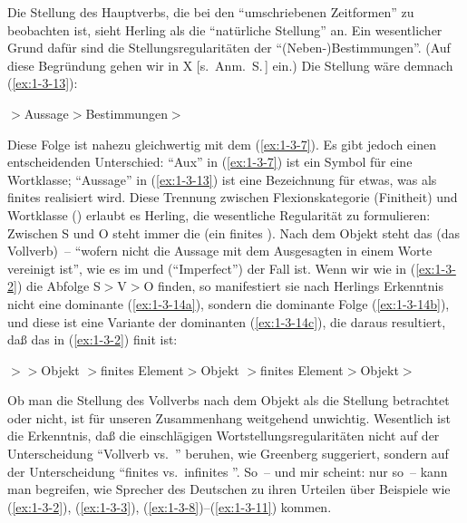 \documentclass[output=paper]{langsci/langscibook}
\begin{document}
Die Stellung des Hauptverbs, die bei den "`umschriebenen Zeitformen"' zu beobachten ist, sieht Herling als die "`natürliche Stellung"' an. Ein wesentlicher Grund dafür sind die Stellungsregularitäten der "`(Neben-)Bestimmungen"'. (Auf diese Begründung gehen wir in X [s.\ Anm.\ S.\,\pageref{fn-herausgeber-topo}]\label{X:8} ein.) Die  Stellung wäre demnach (\ref{ex:1-3-13}):
\begin{exe}
\ex\label{ex:1-3-13}
$>$Aussage$>$Bestimmungen$>$
\end{exe}
Diese Folge ist nahezu gleichwertig mit dem  (\ref{ex:1-3-7}). Es gibt jedoch einen entscheidenden Unterschied: "`Aux"' in (\ref{ex:1-3-7}) ist ein Symbol für eine Wortklasse; "`Aussage"' in (\ref{ex:1-3-13}) ist eine Bezeichnung für etwas, was als finites  realisiert wird. Diese
Trennung zwischen Flexionskategorie (Finitheit) und Wortklasse () erlaubt es
Herling, die wesentliche Regularität zu formulieren: Zwischen S und O steht immer
die  (ein finites ). Nach dem Objekt steht das  (das Vollverb)~–
"`wofern nicht die Aussage mit dem Ausgesagten in einem Worte vereinigt ist"', wie
es im  und  ("`Imperfect"') der Fall ist. Wenn wir wie in (\ref{ex:1-3-2}) die Abfolge S$>$V$>$O finden, so manifestiert sie nach Herlings Erkenntnis nicht eine dominante  (\ref{ex:1-3-14a}), sondern die dominante Folge (\ref{ex:1-3-14b}), und diese ist eine Variante der dominanten  (\ref{ex:1-3-14c}), die daraus resultiert, daß das  in (\ref{ex:1-3-2})
finit ist:
\pagebreak
\begin{exe}
\ex\label{ex:1-3-14}
\begin{xlist}
\ex\label{ex:1-3-14a} $>$$>$Objekt
\ex\label{ex:1-3-14b} $>$finites Element$>$Objekt
\ex\label{ex:1-3-14c} $>$finites Element$>$Objekt$>$
\end{xlist}
\end{exe}
Ob man die Stellung des Vollverbs nach dem Objekt als die  Stellung
betrachtet oder nicht, ist für unseren Zusammenhang weitgehend unwichtig. Wesentlich ist die Erkenntnis, daß die einschlägigen Wortstellungsregularitäten nicht
auf der Unterscheidung "`Vollverb vs.\ "' beruhen, wie Greenberg suggeriert,
sondern auf der Unterscheidung "`finites vs.\ infinites "'. So~-- und mir scheint:
nur so~-- kann man begreifen, wie Sprecher des Deutschen zu ihren Urteilen über Beispiele wie (\ref{ex:1-3-2}), (\ref{ex:1-3-3}), (\ref{ex:1-3-8})--(\ref{ex:1-3-11}) kommen.
\end{document}
